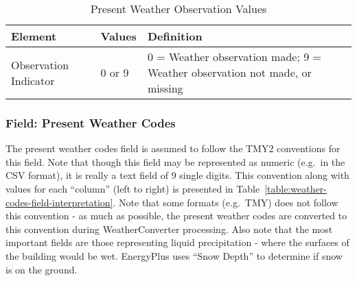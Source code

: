 \begin{longtable}[c]{p{1.5in}p{1.5in}p{3.0in}}
\caption{Present Weather Observation Values \protect \label{table:present-weather-observation-values}}\\
\toprule 
Element & Values & Definition \tabularnewline \midrule
\endhead
Observation Indicator & 0 or 9 & 0 = Weather observation made; 9 = Weather observation not made, or missing \tabularnewline
\bottomrule
\end{longtable}

\subsubsection{Field: Present Weather Codes}\label{field-present-weather-codes}

The present weather codes field is assumed to follow the TMY2 conventions for this field. Note that though this field may be represented as numeric (e.g.~in the CSV format), it is really a text field of 9 single digits. This convention along with values for each ``column'' (left to right) is presented in Table~\ref{table:weather-codes-field-interpretation}. Note that some formats (e.g.~TMY) does not follow this convention - as much as possible, the present weather codes are converted to this convention during WeatherConverter processing. Also note that the most important fields are those representing liquid precipitation - where the surfaces of the building would be wet. EnergyPlus uses ``Snow Depth'' to determine if snow is on the ground.

